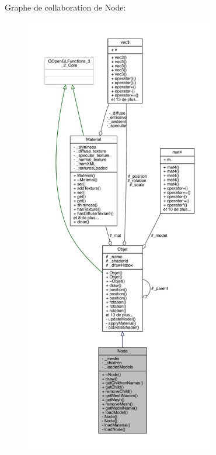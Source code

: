 Graphe de collaboration de Node\+:
\nopagebreak
\begin{figure}[H]
\begin{center}
\leavevmode
\includegraphics[height=550pt]{class_node__coll__graph}
\end{center}
\end{figure}
